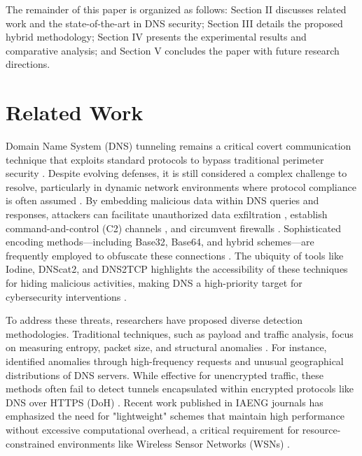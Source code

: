 \documentclass[journal]{IAENGtran}
\begin{document}
The remainder of this paper is organized as follows: Section II discusses related work and the state-of-the-art in DNS security; Section III details the proposed hybrid methodology; Section IV presents the experimental results and comparative analysis; and Section V concludes the paper with future research directions.

\section{Related Work}

Domain Name System (DNS) tunneling remains a critical covert communication technique that exploits standard protocols to bypass traditional perimeter security \cite{hynek2022summary, jerabek2023dns}. Despite evolving defenses, it is still considered a complex challenge to resolve, particularly in dynamic network environments where protocol compliance is often assumed \cite{kim2025reinforcement}. By embedding malicious data within DNS queries and responses, attackers can facilitate unauthorized data exfiltration \cite{boonyopakorn2024malicious}, establish command-and-control (C2) channels \cite{casanova2023malicious}, and circumvent firewalls \cite{akem2025real}. Sophisticated encoding methods—including Base32, Base64, and hybrid schemes—are frequently employed to obfuscate these connections \cite{afek2025pops, bozkurt2024new}. The ubiquity of tools like Iodine, DNScat2, and DNS2TCP highlights the accessibility of these techniques for hiding malicious activities, making DNS a high-priority target for cybersecurity interventions \cite{gursoy2024dns, alsajri2024intrusion}.

To address these threats, researchers have proposed diverse detection methodologies. Traditional techniques, such as payload and traffic analysis, focus on measuring entropy, packet size, and structural anomalies \cite{alzighaibi2023detection, singh2025optimizing}. For instance, \cite{bozkurt2024new} identified anomalies through high-frequency requests and unusual geographical distributions of DNS servers. While effective for unencrypted traffic, these methods often fail to detect tunnels encapsulated within encrypted protocols like DNS over HTTPS (DoH) \cite{gursoy2024dns}. Recent work published in IAENG journals has emphasized the need for "lightweight" schemes that maintain high performance without excessive computational overhead, a critical requirement for resource-constrained environments like Wireless Sensor Networks (WSNs) \cite{liu2025intrusion}.
\end{document}
